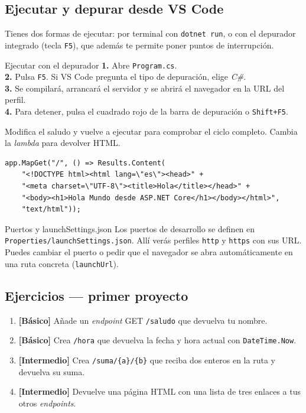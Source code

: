 \documentclass[11pt]{article}
\begin{document}
\subsection{Ejecutar y depurar desde VS Code}
Tienes dos formas de ejecutar: por terminal con \texttt{dotnet run}, o con el depurador integrado (tecla \texttt{F5}), que además te permite poner puntos de interrupción.

\begin{cajavscode}{Ejecutar con el depurador}
\textbf{1.} Abre \texttt{Program.cs}.\\
\textbf{2.} Pulsa \texttt{F5}. Si VS Code pregunta el tipo de depuración, elige \emph{C\#}.\\
\textbf{3.} Se compilará, arrancará el servidor y se abrirá el navegador en la URL del perfil.\\
\textbf{4.} Para detener, pulsa el cuadrado rojo de la barra de depuración o \texttt{Shift+F5}.
\end{cajavscode}
\vspace{2pt}
Modifica el saludo y vuelve a ejecutar para comprobar el ciclo completo. Cambia la \emph{lambda} para devolver HTML.

\begin{cajacodigo}
\begin{lstlisting}[style=cs]
app.MapGet("/", () => Results.Content(
    "<!DOCTYPE html><html lang=\"es\"><head>" +
    "<meta charset=\"UTF-8\"><title>Hola</title></head>" +
    "<body><h1>Hola Mundo desde ASP.NET Core</h1></body></html>",
    "text/html"));
\end{lstlisting}
\end{cajacodigo}
\vspace{2pt}
\begin{cajatip}{Puertos y launchSettings.json}
Los puertos de desarrollo se definen en \texttt{Properties/launchSettings.json}. Allí verás perfiles \texttt{http} y \texttt{https} con sus URL. Puedes cambiar el puerto o pedir que el navegador se abra automáticamente en una ruta concreta (\texttt{launchUrl}).\par
\end{cajatip}

\subsection{Ejercicios — primer proyecto}
\begin{enumerate}[leftmargin=1.7em,itemsep=3pt,topsep=2pt]
\item \textbf{[Básico]} Añade un \emph{endpoint} GET \texttt{/saludo} que devuelva tu nombre.
\item \textbf{[Básico]} Crea \texttt{/hora} que devuelva la fecha y hora actual con \texttt{DateTime.Now}.
\item \textbf{[Intermedio]} Crea \texttt{/suma/\{a\}/\{b\}} que reciba dos enteros en la ruta y devuelva su suma.
\item \textbf{[Intermedio]} Devuelve una página HTML con una lista de tres enlaces a tus otros \emph{endpoints}.
\end{enumerate}
\end{document}
